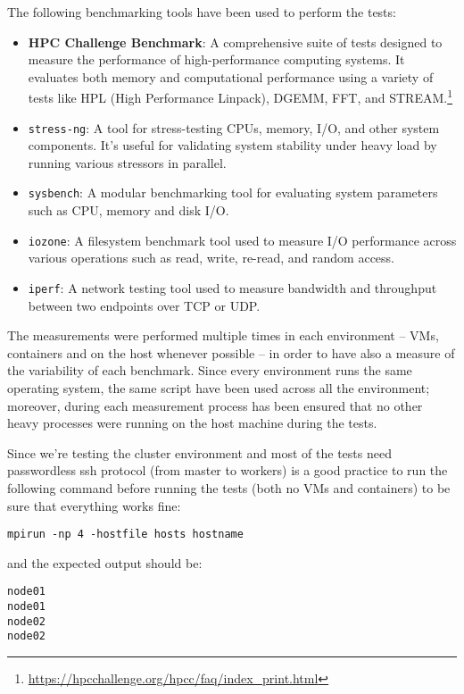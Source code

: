 The following benchmarking tools have been used to perform the tests:

\begin{itemize}
    \item \textbf{HPC Challenge Benchmark}: A comprehensive suite of tests designed to measure the performance of high-performance computing systems. It evaluates both memory and computational performance using a variety of tests like HPL (High Performance Linpack), DGEMM, FFT, and STREAM.\footnote{\url{https://hpcchallenge.org/hpcc/faq/index_print.html}}
    \item \texttt{stress-ng}: A tool for stress-testing CPUs, memory, I/O, and other system components. It’s useful for validating system stability under heavy load by running various stressors in parallel.
    \item \texttt{sysbench}: A modular benchmarking tool for evaluating system parameters such as CPU, memory and disk I/O.
    \item \texttt{iozone}: A filesystem benchmark tool used to measure I/O performance across various operations such as read, write, re-read, and random access.
    \item \texttt{iperf}: A network testing tool used to measure bandwidth and throughput between two endpoints over TCP or UDP. 
\end{itemize}

The measurements were performed multiple times in each environment -- VMs, containers and on the host whenever possible --  in order to have also a measure of the variability of each benchmark. Since every environment runs the same operating system, the same script have been used across all the environment; moreover, during each measurement process has been ensured that no other heavy processes were running on the host machine during the tests.\\

\par Since we're testing the cluster environment and most of the tests need passwordless ssh protocol (from master to workers) is a good practice to run the following command before running the tests (both no VMs and containers) to be sure that everything works fine:

\begin{verbatim}
mpirun -np 4 -hostfile hosts hostname
\end{verbatim}

and the expected output should be:

\begin{verbatim}
node01
node01
node02
node02
\end{verbatim}


